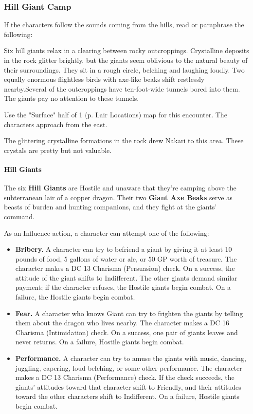 \documentclass[letterpaper, 11pt, twocolumn]{dndbook}
\begin{document}
\subsubsection{Hill Giant Camp}

If the characters follow the sounds coming from the hills, read or paraphrase the following:

\begin{DndReadAloud}
Six hill giants relax in a clearing between rocky outcroppings. Crystalline deposits in the rock glitter brightly, but the giants seem oblivious to the natural beauty of their surroundings. They sit in a rough circle, belching and laughing loudly. Two equally enormous flightless birds with axe-like beaks shift restlessly nearby.Several of the outcroppings have ten-foot-wide tunnels bored into them. The giants pay no attention to these tunnels.
\end{DndReadAloud}

Use the "Surface" half of 1 (p. Lair Locations) map for this encounter. The characters approach from the east.

The glittering crystalline formations in the rock drew Nakari to this area. These crystals are pretty but not valuable.

\paragraph{Hill Giants}

The six \textbf{Hill Giants} are Hostile and unaware that they're camping above the subterranean lair of a copper dragon. Their two \textbf{Giant Axe Beaks} serve as beasts of burden and hunting companions, and they fight at the giants' command.

As an Influence action, a character can attempt one of the following:

\begin{itemize}
\item \textbf{Bribery.} A character can try to befriend a giant by giving it at least 10 pounds of food, 5 gallons of water or ale, or 50 GP worth of treasure. The character makes a DC 13 Charisma (Persuasion) check. On a success, the attitude of the giant shifts to Indifferent. The other giants demand similar payment; if the character refuses, the Hostile giants begin combat. On a failure, the Hostile giants begin combat.
\item \textbf{Fear.} A character who knows Giant can try to frighten the giants by telling them about the dragon who lives nearby. The character makes a DC 16 Charisma (Intimidation) check. On a success, one pair of giants leaves and never returns. On a failure, Hostile giants begin combat.
\item \textbf{Performance.} A character can try to amuse the giants with music, dancing, juggling, capering, loud belching, or some other performance. The character makes a DC 13 Charisma (Performance) check. If the check succeeds, the giants' attitudes toward that character shift to Friendly, and their attitudes toward the other characters shift to Indifferent. On a failure, Hostile giants begin combat.
\end{itemize}
\end{document}
